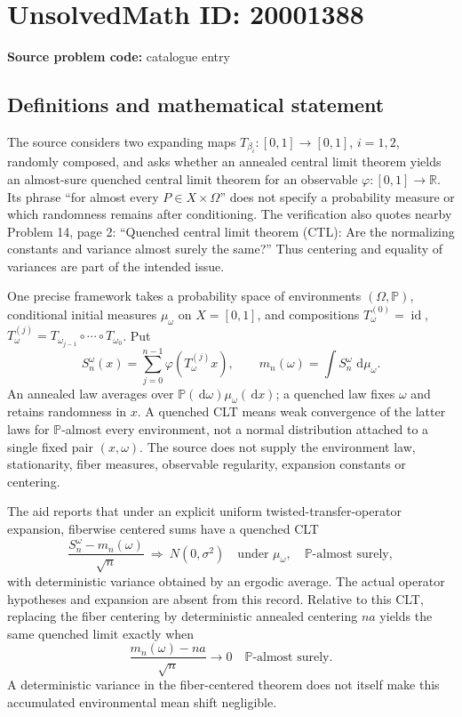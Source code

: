 \documentclass[11pt]{article}
\newcommand{\R}{\mathbb{R}}
\newcommand{\dd}{\,\mathrm{d}}
\begin{document}
\section*{UnsolvedMath ID: 20001388}
\textbf{Source problem code:} catalogue entry
\subsection{Definitions and mathematical statement}
The source considers two expanding maps \(T_{\beta_i}:[0,1]\to[0,1]\), \(i=1,2\), randomly composed, and asks whether an annealed central limit theorem yields an almost-sure quenched central limit theorem for an observable \(\varphi:[0,1]\to\R\). Its phrase ``for almost every \(P\in X\times\Omega\)'' does not specify a probability measure or which randomness remains after conditioning. The verification also quotes nearby Problem 14, page 2: ``Quenched central limit theorem (CTL): Are the normalizing constants and variance almost surely the same?'' Thus centering and equality of variances are part of the intended issue.

One precise framework takes a probability space of environments \((\Omega,\mathbb P)\), conditional initial measures \(\mu_\omega\) on \(X=[0,1]\), and compositions \(T_\omega^{(0)}=\operatorname{id}\), \(T_\omega^{(j)}=T_{\omega_{j-1}}\circ\cdots\circ T_{\omega_0}\). Put
\[
S_n^\omega(x)=\sum_{j=0}^{n-1}\varphi(T_\omega^{(j)}x),\qquad
m_n(\omega)=\int S_n^\omega\,\dd\mu_\omega.
\]
An annealed law averages over \(\mathbb P(\dd\omega)\mu_\omega(\dd x)\); a quenched law fixes \(\omega\) and retains randomness in \(x\). A quenched CLT means weak convergence of the latter laws for \(\mathbb P\)-almost every environment, not a normal distribution attached to a single fixed pair \((x,\omega)\). The source does not supply the environment law, stationarity, fiber measures, observable regularity, expansion constants or centering.

The aid reports that under an explicit uniform twisted-transfer-operator expansion, fiberwise centered sums have a quenched CLT
\[
\frac{S_n^\omega-m_n(\omega)}{\sqrt n}\ \Longrightarrow\ N(0,\sigma^2)
\quad\text{under }\mu_\omega,\quad\mathbb P\text{-almost surely},
\]
with deterministic variance obtained by an ergodic average. The actual operator hypotheses and expansion are absent from this record. Relative to this CLT, replacing the fiber centering by deterministic annealed centering \(na\) yields the same quenched limit exactly when
\[
\frac{m_n(\omega)-na}{\sqrt n}\longrightarrow0
\quad\mathbb P\text{-almost surely}.
\]
A deterministic variance in the fiber-centered theorem does not itself make this accumulated environmental mean shift negligible.
\end{document}
